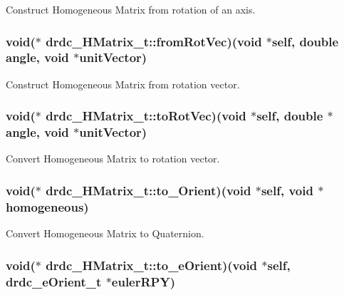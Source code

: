 Construct Homogeneous Matrix from rotation of an axis. 

\hypertarget{structdrdc__HMatrix__t_9a588ae7f69e12776056643b2e4477aa}{
\subsubsection[fromRotVec]{\setlength{\rightskip}{0pt plus 5cm}void($\ast$ {\bf drdc\_\-HMatrix\_\-t::fromRotVec})(void $\ast$self, double angle, void $\ast$unitVector)}}
\label{structdrdc__HMatrix__t_9a588ae7f69e12776056643b2e4477aa}


Construct Homogeneous Matrix from rotation vector. 

\hypertarget{structdrdc__HMatrix__t_f6d72ccdd0cb8fae5bd0331abb616dc6}{
\subsubsection[toRotVec]{\setlength{\rightskip}{0pt plus 5cm}void($\ast$ {\bf drdc\_\-HMatrix\_\-t::toRotVec})(void $\ast$self, double $\ast$angle, void $\ast$unitVector)}}
\label{structdrdc__HMatrix__t_f6d72ccdd0cb8fae5bd0331abb616dc6}


Convert Homogeneous Matrix to rotation vector. 

\hypertarget{structdrdc__HMatrix__t_0b7448261d2d879f92800461aed4e09e}{
\subsubsection[to\_\-Orient]{\setlength{\rightskip}{0pt plus 5cm}void($\ast$ {\bf drdc\_\-HMatrix\_\-t::to\_\-Orient})(void $\ast$self, void $\ast$homogeneous)}}
\label{structdrdc__HMatrix__t_0b7448261d2d879f92800461aed4e09e}


Convert Homogeneous Matrix to Quaternion. 

\hypertarget{structdrdc__HMatrix__t_8c9ab96f1d2099138e7f9bace51c9fb1}{
\subsubsection[to\_\-eOrient]{\setlength{\rightskip}{0pt plus 5cm}void($\ast$ {\bf drdc\_\-HMatrix\_\-t::to\_\-eOrient})(void $\ast$self, {\bf drdc\_\-eOrient\_\-t} $\ast$eulerRPY)}}
\label{structdrdc__HMatrix__t_8c9ab96f1d2099138e7f9bace51c9fb1}


